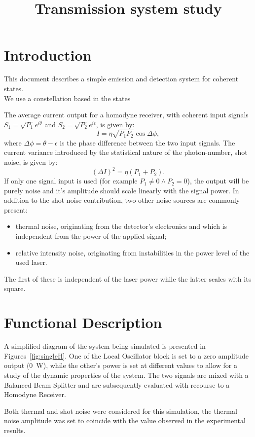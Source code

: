 \documentclass[a4paper]{article}
\title{Transmission system study}
\author{}
\date{}
\begin{document}
\maketitle

\section{Introduction}\label{sec:intro}

This document describes a simple emission and detection system for coherent states.\\
We use a constellation based in the states 


The average current output for a homodyne receiver, with coherent input signals $S_1=\sqrt{P_1}e^{i\theta}$ and $S_2=\sqrt{P_2}e^{i\epsilon}$, is given by:
\begin{equation}
I=\eta\sqrt{P_1P_2}\cos\Delta\phi,
\end{equation}
where $\Delta\phi=\theta-\epsilon$ is the phase difference between the two input signals. The current variance introduced by the statistical nature of the photon-number, shot noise, is given by:
\begin{equation}
(\Delta I)^2=\eta(P_1+P_2).
\end{equation}
If only one signal input is used (for example $P_1\neq0\wedge P_2=0$), the output will be purely noise and it's amplitude should scale linearly with the signal power. In addition to the shot noise contribution, two other noise sources are commonly present: 
\begin{itemize}
\item thermal noise, originating from the detector’s electronics and which is independent from the power of the applied signal;
\item relative intensity noise, originating from instabilities in the power level of the used laser.
\end{itemize}
The first of these is independent of the laser power while the latter scales with its square.

\section{Functional Description}

A simplified diagram of the system being simulated is presented in Figures~\ref{fig:singleH}. One of the Local Oscillator block is set to a zero amplitude output (0~W), while the other's power is set at different values to allow for a study of the dynamic properties of the system. The two signals are mixed with a Balanced Beam Splitter and are subsequently evaluated with recourse to a Homodyne Receiver.
\par
Both thermal and shot noise were considered for this simulation, the thermal noise amplitude was set to coincide with the value observed in the experimental results.
\end{document}
